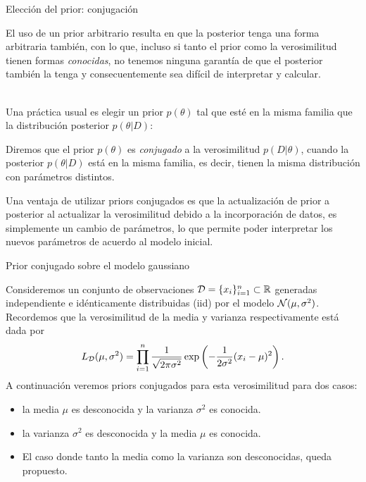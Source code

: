 \documentclass[9pt]{beamer}
\begin{document}
\begin{frame}{Elección del prior: conjugación}
	
El uso de un prior arbitrario resulta en que la posterior tenga una forma arbitraria también, con lo que, incluso si tanto el prior como la verosimilitud tienen formas \emph{conocidas}, no tenemos ninguna garantía de que el posterior también la tenga y consecuentemente sea difícil de interpretar y calcular.\\~\ \pause

 Una práctica usual es elegir un prior $p(\theta)$ tal que esté en la misma familia que la distribución posterior $p(\theta|D)$:

\begin{definition}
	Diremos que el prior $p(\theta)$ es \emph{conjugado} a la verosimilitud $p(D|\theta)$, cuando la posterior $p(\theta|D)$ está en la misma familia, es decir, tienen la misma distribución con parámetros distintos.   
\end{definition}\pause

Una ventaja de utilizar priors conjugados es que la actualización de prior a posterior al actualizar la verosimilitud debido a la incorporación de datos, es simplemente un cambio de parámetros, lo que permite poder interpretar los nuevos parámetros de acuerdo al modelo inicial.

\end{frame}

\begin{frame}{Prior conjugado sobre el modelo gaussiano}

Consideremos un conjunto de observaciones ${\mathcal D}=\{x_i\}_{i=1}^n\subset\mathbb{R}$ generadas independiente e idénticamente distribuidas (iid) por el modelo ${\mathcal N}(\mu,\sigma^2)$. Recordemos que la verosimilitud de la media y varianza respectivamente está dada por 
\begin{equation}
	L_{\mathcal D}(\mu, \sigma^2) = \prod_{i=1}^n \frac{1}{\sqrt{2\pi\sigma^2}}\exp\left(-\frac{1}{2\sigma^2}(x_i-\mu)^2\right).
 \end{equation}
\pause
A continuación veremos priors conjugados para esta verosimilitud para dos casos:

\begin{itemize}
	\item la media $\mu$ es desconocida y la varianza $\sigma^2$ es conocida.
	\item la varianza $\sigma^2$ es desconocida y la media $\mu$ es conocida.
	\item El caso donde tanto la media como la varianza son desconocidas, queda propuesto.
\end{itemize}

\end{frame}
\end{document}
